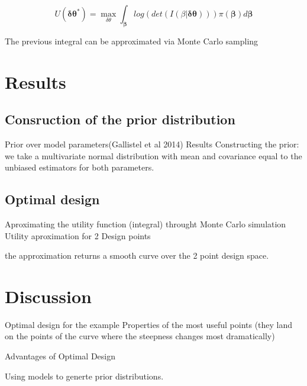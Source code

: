 \documentclass[preprint,review,12pt]{elsarticle}
\begin{document}
\begin{equation}
U(\mathbf{\delta\theta}^{*})=\max_{\delta\theta} \int_{\mathbf{\beta}} log(det(I(\beta|\mathbf{\delta\theta}))) \pi(\mathbf{\beta}) d\mathbf{\beta}
\end{equation}

The previous integral can be approximated via Monte Carlo sampling

\section{Results}
\label{S:3}

\subsection{Consruction of the prior distribution}

Prior over model parameters(Gallistel et al 2014)
Results
Constructing the prior: we take a multivariate normal distribution with mean and covariance equal to the unbiased estimators for both parameters.


\subsection{Optimal design}

Aproximating the utility function (integral) throught Monte Carlo simulation 
Utility aproximation for 2 Design points 

the approximation returns a smooth curve over the 2 point design space.

\section{Discussion}
\label{S:3}

Optimal design for the example
Properties of the most useful points (they land on the points of the curve where the steepness changes most dramatically)

Advantages of Optimal Design

Using models to generte prior distributions.


\end{document}
